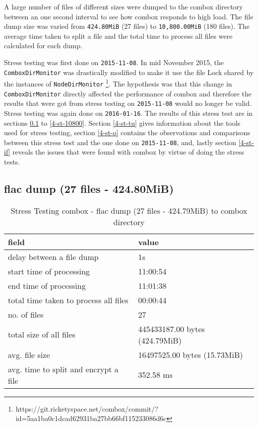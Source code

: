 A large number of files of different sizes were dumped to the combox
directory between an one second interval to see how combox responds to
high load. The file dump size was varied from \verb+424.80MiB+ (27
files) to \verb+10,800.00MiB+ (180 files). The average time taken to
split a file and the total time to process all files were calculated
for each dump.

Stress testing was first done on \verb+2015-11-08+. In mid November
2015, the \\ \verb+ComboxDirMonitor+ was drastically modified to make
it use the file Lock shared by the instances of \verb+NodeDirMonitor+
\footnote{https://git.ricketyspace.net/combox/commit/?id=5aa1ba0c1dcad62931ba27bb66bf115233086d6c}.
The hypothesis was that this change in \verb+ComboxDirMonitor+
directly affected the performance of combox and therefore the results
that were got from stress testing on \verb+2015-11-08+ would no longer
be valid. Stress testing was again done on \verb+2016-01-16+. The
results of this stress test are in sections \ref{4-st-424} to
\ref{4-st-10800}. Section \ref{4-st-tu} gives information about the
tools used for stress testing, section \ref{4-st-o} contains the
observations and comparisons between this stress test and the one done
on \verb+2015-11-08+, and, lastly section \ref{4-st-if} reveals the
issues that were found with combox by virtue of doing the stress
tests.

\subsection{flac dump (27 files - 424.80MiB)}\label{4-st-424}

\begin{center}
  \begin{table}[h]
    \begin{tabular}{ll}
      field & value\\
      \hline
      delay between a file dump & 1s\\
      start time of processing & 11:00:54\\
      end time of processing & 11:01:38\\
      total time taken to process all files & 00:00:44\\
      no. of files & 27\\
      total size of all files & 445433187.00 bytes (424.79MiB)\\
      avg. file size & 16497525.00 bytes (15.73MiB)\\
      avg. time to split and encrypt a file & 352.58 ms\\
    \end{tabular}
    \caption{Stress Testing combox - flac dump (27 files - 424.79MiB) to combox directory}
  \end{table}
\end{center}

